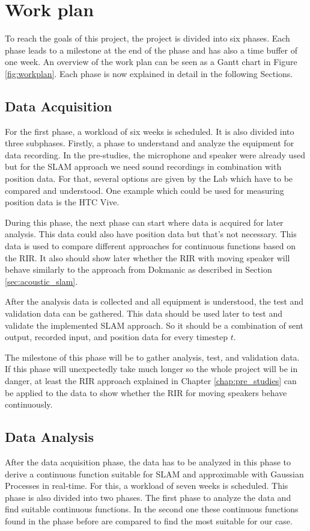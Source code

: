 \section{Work plan}

To reach the goals of this project, the project is divided into six phases. Each phase leads to a milestone at the end of the phase and has also a time buffer of one week. An overview of the work plan can be seen as a Gantt chart in Figure \ref{fig:workplan}. Each phase is now explained in detail in the following Sections.

\subsection{Data Acquisition}
\label{phase:data_aqui}
For the first phase, a workload of six weeks is scheduled. It is also divided into three subphases. Firstly, a phase to understand and analyze the equipment for data recording. In the pre-studies, the microphone and speaker were already used but for the SLAM approach we need sound recordings in combination with position data. For that, several options are given by the Lab which have to be compared and understood. One example which could be used for measuring position data is the HTC Vive.

During this phase, the next phase can start where data is acquired for later analysis. This data could also have position data but that's not necessary. This data is used to compare different approaches for continuous functions based on the RIR. It also should show later whether the RIR with moving speaker will behave similarly to the approach from Dokmanic \cite{dokmanic_roomrecslam_2016} as described in Section \ref{sec:acoustic_slam}.

After the analysis data is collected and all equipment is understood, the test and validation data can be gathered. This data should be used later to test and validate the implemented SLAM approach. So it should be a combination of sent output, recorded input, and position data for every timestep $t$.

The milestone of this phase will be to gather analysis, test, and validation data. If this phase will unexpectedly take much longer so the whole project will be in danger, at least the RIR approach explained in Chapter \ref{chap:pre_studies} can be applied to the data to show whether the RIR for moving speakers behave continuously. 

\subsection{Data Analysis}
\label{phase:data_analysis}
After the data acquisition phase, the data has to be analyzed in this phase to derive a continuous function suitable for SLAM and approximable with Gaussian Processes in real-time. For this, a workload of seven weeks is scheduled. This phase is also divided into two phases. The first phase to analyze the data and find suitable continuous functions. In the second one these continuous functions found in the phase before are compared to find the most suitable for our case.


